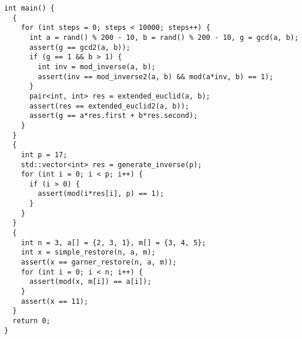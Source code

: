 \begin{lstlisting}
int main() {
  {
    for (int steps = 0; steps < 10000; steps++) {
      int a = rand() % 200 - 10, b = rand() % 200 - 10, g = gcd(a, b);
      assert(g == gcd2(a, b));
      if (g == 1 && b > 1) {
        int inv = mod_inverse(a, b);
        assert(inv == mod_inverse2(a, b) && mod(a*inv, b) == 1);
      }
      pair<int, int> res = extended_euclid(a, b);
      assert(res == extended_euclid2(a, b));
      assert(g == a*res.first + b*res.second);
    }
  }
  {
    int p = 17;
    std::vector<int> res = generate_inverse(p);
    for (int i = 0; i < p; i++) {
      if (i > 0) {
        assert(mod(i*res[i], p) == 1);
      }
    }
  }
  {
    int n = 3, a[] = {2, 3, 1}, m[] = {3, 4, 5};
    int x = simple_restore(n, a, m);
    assert(x == garner_restore(n, a, m));
    for (int i = 0; i < n; i++) {
      assert(mod(x, m[i]) == a[i]);
    }
    assert(x == 11);
  }
  return 0;
}
\end{lstlisting}
